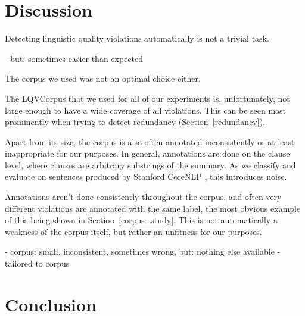 \documentclass[a4paper,10pt]{scrartcl}
\theoremstyle{style}
\begin{document}




\section{Discussion}
\label{discussion}
Detecting linguistic quality violations automatically is not a trivial task.

- but: sometimes easier than expected

The corpus we used was not an optimal choice either.

The LQVCorpus that we used for all of our experiments is, unfortunately, not large enough to have a wide coverage of all violations. This can be seen most prominently when trying to detect redundancy (Section~\ref{redundancy}).

Apart from its size, the corpus is also often annotated inconsistently or at least inappropriate for our purposes. In general, annotations are done on the clause level, where clauses are arbitrary substrings of the summary. As we classify and evaluate on sentences produced by Stanford CoreNLP \citep{manning-EtAl:2014:P14-5}, this introduces noise.

Annotations aren't done consistently throughout the corpus, and often very different violations are annotated with the same label, the most obvious example of this being shown in Section~\ref{corpus_study}. This is not automatically a weakness of the corpus itself, but rather an unfitness for our purposes.

- corpus: small, inconsistent, sometimes wrong, but: nothing else available
- tailored to corpus


\section{Conclusion} %
\label{conclusion}

\newpage


\end{document}
